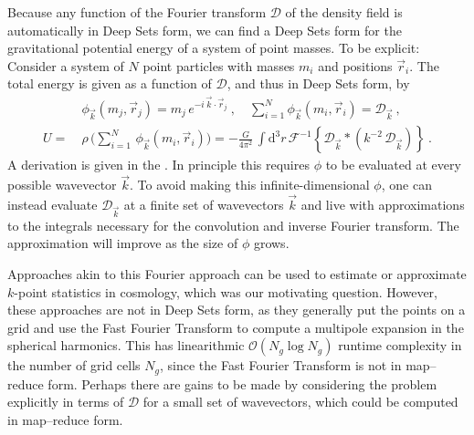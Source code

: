 \documentclass[10pt]{article}
\renewcommand{\d}{\mathrm{d}}
\begin{document}
Because any function of the Fourier transform $\mathcal{D}$ of the density field is automatically in Deep Sets form,
we can find a Deep Sets form for the gravitational potential energy of a system of point masses.
To be explicit: Consider a system of $N$ point particles with masses $m_i$ and positions $\vec{r}_i$.
The total energy is given as a function of $\mathcal{D}$, and thus in Deep Sets form, by
\begin{align}
    &\phi_{\vec{k}}(m_j, \vec{r}_j)
    =m_j \, e^{-i \, \vec{k} \cdot \vec{r}_j}
    ~,
    \quad
    \sum_{i=1}^{N} \phi_{\vec{k}}(m_i, \vec{r}_i)
    = \mathcal{D}_{\vec{k}}~,
    \nonumber\\
    U = \ &\rho \, \big( \sum_{i=1}^{N} \, \phi_{\vec{k}}(m_i, \vec{r}_i) \big)
    = -\frac{G}{4 \pi^2} \,
        \int \d^3 r \,
        \mathcal{F}^{-1}\!\left\{
            \mathcal{D}_{\vec{k}} \ast \left(
            k^{-2} \, \mathcal{D}_{\vec{k}} \right)
        \right\}~.
    \label{eq:EnergyDeepSets}
\end{align}
A derivation is given in the .
In principle this requires $\phi$ to be evaluated at every possible wavevector $\vec{k}$.
To avoid making this infinite-dimensional $\phi$, one can instead evaluate $\mathcal{D}_{\vec{k}}$ at a finite set of wavevectors $\vec{k}$ and live with approximations to the integrals necessary for the convolution and inverse Fourier transform.
The approximation will improve as the size of $\phi$ grows.

Approaches akin to this Fourier approach can be used \citep[and are used; e.g.,][]{SlepianEisenstein2016,Portillo+2018,Philcox+2022ENCORE} to estimate or approximate $k$-point statistics in cosmology, which was our motivating question.
However, these approaches are not in Deep Sets form, as they generally put the points on a grid and use the Fast Fourier Transform to compute a multipole expansion in the spherical harmonics.
This has linearithmic $\mathcal{O}(N_g \log N_g)$ runtime complexity in the number of grid cells $N_g$, since the Fast Fourier Transform is not in map--reduce form.
Perhaps there are gains to be made by considering the problem explicitly in terms of $\mathcal{D}$ for a small set of wavevectors, which could be computed in map--reduce form.
\end{document}
